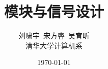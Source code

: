 \documentclass[10pt,a4paper]{article}
\begin{document}
\title{\huge 模块与信号设计}
\author{\small 刘啸宇\ 宋方睿\ 吴育昕\\
	\small 清华大学计算机系}
\date{\small \today}
\maketitle
%

%
%
%
\appendix
%

\end{document}
